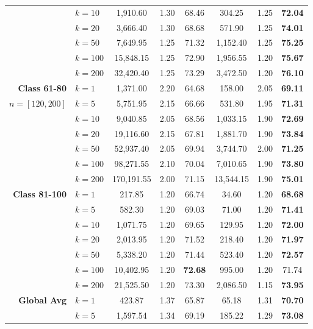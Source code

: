 \begin{table}[htbp]
\begin{tabular}{|l|l|c|c|c|c|c|c|}
     & $k=10$ & 1,910.60 & 1.30 & 68.46 & 304.25 & 1.25 & \textbf{72.04} \\ 
     & $k=20$ & 3,666.40 & 1.30 & 68.68 & 571.90 & 1.25 & \textbf{74.01} \\ 
     & $k=50$ & 7,649.95 & 1.25 & 71.32 & 1,152.40 & 1.25 & \textbf{75.25} \\ 
     & $k=100$ & 15,848.15 & 1.25 & 72.90 & 1,956.55 & 1.20 & \textbf{75.67} \\ 
     & $k=200$ & 32,420.40 & 1.25 & 73.29 & 3,472.50 & 1.20 & \textbf{76.10} \\ \hline
    \multicolumn{1}{|r|}{\textbf{Class 61-80}} & $k=1$ & 1,371.00 & 2.20 & 64.68 & 158.00 & 2.05 & \textbf{69.11} \\ 
    \multicolumn{1}{|c|}{$n = [120, 200]$} & $k=5$ & 5,751.95 & 2.15 & 66.66 & 531.80 & 1.95 & \textbf{71.31} \\ 
     & $k=10$ & 9,040.85 & 2.05 & 68.56 & 1,033.15 & 1.90 & \textbf{72.69} \\ 
     & $k=20$ & 19,116.60 & 2.15 & 67.81 & 1,881.70 & 1.90 & \textbf{73.84} \\ 
     & $k=50$ & 52,937.40 & 2.05 & 69.94 & 3,744.70 & 2.00 & \textbf{71.25} \\ 
     & $k=100$ & 98,271.55 & 2.10 & 70.04 & 7,010.65 & 1.90 & \textbf{73.80} \\ 
     & $k=200$ & 170,191.55 & 2.00 & 71.15 & 13,544.15 & 1.90 & \textbf{75.01} \\ \hline
    \multicolumn{1}{|r|}{\textbf{Class 81-100}} & $k=1$ & 217.85 & 1.20 & 66.74 & 34.60 & 1.20 & \textbf{68.68} \\ 
     & $k=5$ & 582.30 & 1.20 & 69.03 & 71.00 & 1.20 & \textbf{71.41} \\ 
     & $k=10$ & 1,071.75 & 1.20 & 69.65 & 129.95 & 1.20 & \textbf{72.00} \\ 
     & $k=20$ & 2,013.95 & 1.20 & 71.52 & 218.40 & 1.20 & \textbf{71.97} \\ 
     & $k=50$ & 5,338.20 & 1.20 & 71.44 & 523.40 & 1.20 & \textbf{72.57} \\ 
     & $k=100$ & 10,402.95 & 1.20 & \textbf{72.68} & 995.00 & 1.20 & 71.74 \\ 
     & $k=200$ & 21,525.50 & 1.20 & 73.30 & 2,086.50 & 1.15 & \textbf{73.95} \\ \hline
     \hline
    \multicolumn{1}{|r|}{\textbf{Global Avg}} & $k=1$ & 423.87 & 1.37 & 65.87 & 65.18 & 1.31 & \textbf{70.70} \\ 
     & $k=5$ & 1,597.54 & 1.34 & 69.19 & 185.22 & 1.29 & \textbf{73.08} \\ 

\end{tabular}
\end{table}
